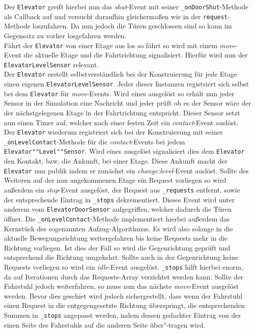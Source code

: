 Der \texttt{Elevator} greift hierbei nun das \textit{shut}-Event mit seiner \texttt{\_onDoorShut}-Methode als Callback auf und versucht daraufhin gleichermaßen wie in der \texttt{request}-Methode loszufahren.
Da nun jedoch die Türen geschlossen sind so kann im Gegensatz zu vorher losgefahren werden. \\

Fährt der \texttt{Elevator} von einer Etage aus los so fährt so wird mit einem \textit{move}-Event die aktuelle Etage und die Fahrtrichtung signalisiert.
Hierfür wird nun der \texttt{ElevatorLevelSensor} relevant. \\

Der \texttt{Elevator} erstellt selbstverständlich bei der Konstruierung für jede Etage einen eigenen \texttt{ElevatorLevelSensor}.
Jeder dieser Instanzen registriert sich selbst bei dem \texttt{Elevator} für \textit{move}-Events.
Wird eines ausgelöst so erhält nun jeder Sensor in der Simulation eine Nachricht und jeder prüft ob es der Sensor wäre der der nächstgelegenen Etage in der Fahrtrichtung entspricht.
Dieser Sensor setzt nun einen Timer auf, welcher nach einer festen Zeit ein \textit{contact}-Event auslöst. \\

Der \texttt{Elevator} wiederum registriert sich bei der Konstruierung mit seiner \texttt{\_onLevelContact}-Methode für die \textit{contact}-Events bei jedem \texttt{Elevator""Level""Sensor}.
Wird eines ausgelöst signalisiert dies dem \texttt{Elevator} den Kontakt, bzw. die Ankunft, bei einer Etage.
Diese Ankunft macht der \texttt{Elevator} nun publik indem er zunächst ein \textit{change:level}-Event auslöst.
Sollte des Weiteren auf der nun angekommenen Etage ein Request vorliegen so wird außerdem ein \textit{stop}-Event ausgelöst, der Request aus \texttt{\_requests} entfernt, sowie der entsprechende Eintrag in \texttt{\_stops} dekrementiert.
Dieses Event wird unter anderem vom \texttt{ElevatorDoorSensor} aufgegriffen, welcher dadurch die Türen öffnet.
Die \texttt{\_onLevelContact}-Methode implementiert hierbei außerdem das Kernstück des sogenannten Aufzug-Algorithmus.
Es wird also solange in die aktuelle Bewegungsrichtung weitergefahren bis keine Requests mehr in die Richtung vorliegen.
Ist dies der Fall so wird die Gegenrichtung geprüft und entsprechend die Richtung umgekehrt.
Sollte auch in der Gegenrichtung keine Requests vorliegen so wird ein \textit{idle}-Event ausgelöst.
\texttt{\_stops} hilft hierbei enorm, da auf Iterationen durch das Requests-Array verzichtet werden kann.
Sollte der Fahrstuhl jedoch weiterfahren, so muss nun das nächste \textit{move}-Event ausgelöst werden.
Bevor dies geschiet wird jedoch sichergestellt, dass wenn der Fahrstuhl einen Request in die entgegengesetzte Richtung überspringt, die entsprechenden Summen in \texttt{\_stops} angepasst werden, indem dessen gedachter Eintrag von der einen Seite des Fahrstuhls auf die anderen Seite über"-tragen wird. \\

